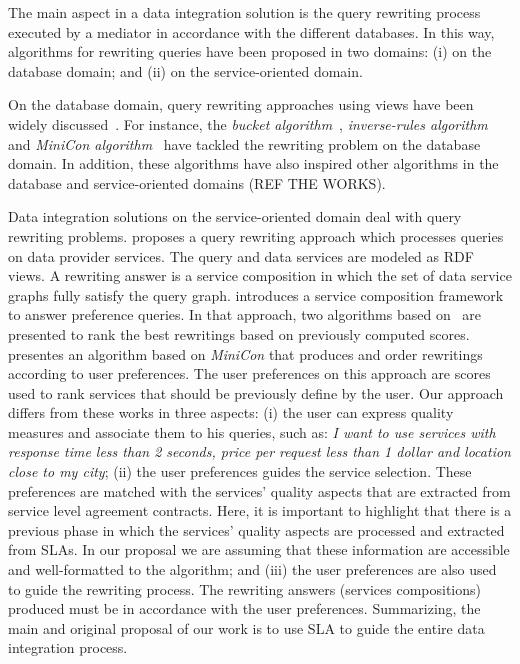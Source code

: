 The main aspect in a data integration solution is 
the query rewriting process executed by a mediator
in accordance with the different databases.
%
In this way, algorithms for rewriting queries have
been proposed in two domains: (i) on the database 
domain; and (ii) on the service-oriented domain.

On the database domain, query rewriting approaches using
views have been widely discussed~\cite{Halevy:2001}.
%
For instance, the \textit{bucket algorithm}~\cite{Levy:1996}, 
\textit{inverse-rules algorithm}~\cite{Duschka:1997} and 
\textit{MiniCon algorithm}~\cite{Pottinger:2001} have
tackled the rewriting problem on the database domain.
%
In addition, these algorithms have also inspired other
algorithms in the database and service-oriented domains (REF THE WORKS).

Data integration solutions on the 
service-oriented domain deal with query rewriting problems.
%
\cite{Barhamgi2010} proposes a query rewriting approach 
which processes queries on data provider services.
The query and data services are modeled as RDF views.
A rewriting answer is a service composition in which 
the set of data service graphs fully satisfy the query graph.  
%
\cite{Benouaret2011} introduces a service composition
framework to answer preference queries. In that approach, two algorithms based
on~\cite{Barhamgi2010} are presented to rank the best rewritings based on previously computed scores.
%
\cite{ba2014} presentes an algorithm based on \textit{MiniCon} 
that produces and order rewritings according to user preferences. 
The user preferences on this approach are scores used to rank 
services that should be previously define by the user.
%
Our approach differs from these works in three aspects:
(i) the user can express quality measures and associate them
to his queries, such as: \textit{I want to use services with response
time less than 2 seconds, price per request less than 1 dollar
and location close to my city}; 
(ii) the user preferences guides the service selection. 
These preferences are matched with the services' quality aspects
that are extracted from service level agreement contracts.
Here, it is important to highlight that there
is a previous phase in which the services' quality aspects are 
processed and extracted from SLAs. 
In our proposal we are assuming that these information are accessible and
well-formatted to the algorithm; and
(iii) the user preferences are also used to guide the rewriting process.
The rewriting answers (services compositions) produced must be in 
accordance with the user preferences.
%
Summarizing, the main and original proposal of our work is to use SLA to guide
the entire data integration process.
     